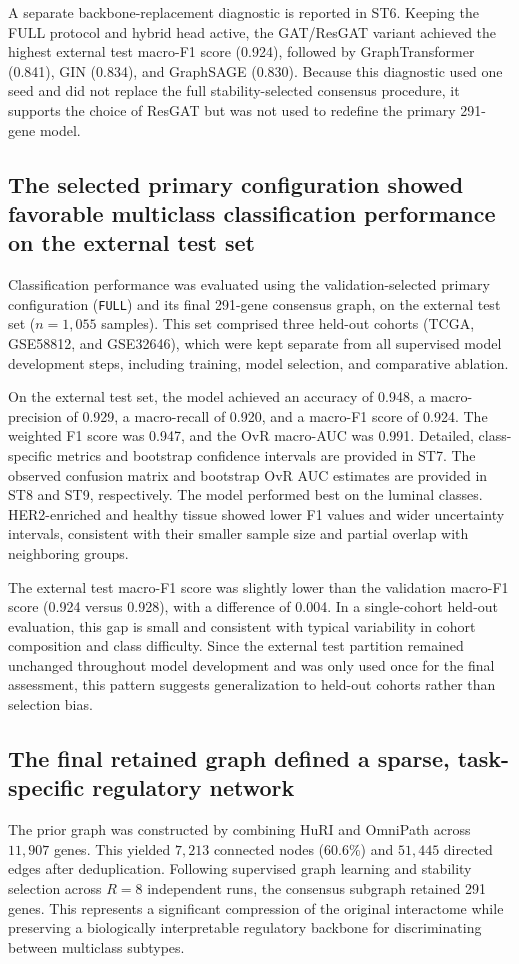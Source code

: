\documentclass[unnumsec,webpdf,modern,large]{oup-authoring-template}
\begin{document}
A separate backbone-replacement diagnostic is reported in ST6. Keeping the FULL protocol and hybrid head active, the GAT/ResGAT variant achieved the highest external test macro-F1 score (0.924), followed by GraphTransformer (0.841), GIN (0.834), and GraphSAGE (0.830). Because this diagnostic used one seed and did not replace the full stability-selected consensus procedure, it supports the choice of ResGAT but was not used to redefine the primary 291-gene model.

\subsection{The selected primary configuration showed favorable multiclass classification performance on the external test set}
Classification performance was evaluated using the validation-selected primary configuration (\texttt{FULL}) and its final 291-gene consensus graph, on the external test set (\(n=1{,}055\) samples). This set comprised three held-out cohorts (TCGA, GSE58812, and GSE32646), which were kept separate from all supervised model development steps, including training, model selection, and comparative ablation.

On the external test set, the model achieved an accuracy of 0.948, a macro-precision of 0.929, a macro-recall of 0.920, and a macro-F1 score of 0.924. The weighted F1 score was 0.947, and the OvR macro-AUC was 0.991. Detailed, class-specific metrics and bootstrap confidence intervals are provided in ST7. The observed confusion matrix and bootstrap OvR AUC estimates are provided in ST8 and ST9, respectively. The model performed best on the luminal classes. HER2-enriched and healthy tissue showed lower F1 values and wider uncertainty intervals, consistent with their smaller sample size and partial overlap with neighboring groups.

The external test macro-F1 score was slightly lower than the validation macro-F1 score (0.924 versus 0.928), with a difference of 0.004. In a single-cohort held-out evaluation, this gap is small and consistent with typical variability in cohort composition and class difficulty. Since the external test partition remained unchanged throughout model development and was only used once for the final assessment, this pattern suggests generalization to held-out cohorts rather than selection bias.

\subsection{The final retained graph defined a sparse, task-specific regulatory network}
The prior graph was constructed by combining HuRI and OmniPath across \(11{,}907\) genes. This yielded \(7{,}213\) connected nodes (\(60.6\%\)) and \(51{,}445\) directed edges after deduplication. Following supervised graph learning and stability selection across \(R=8\) independent runs, the consensus subgraph retained 291 genes. This represents a significant compression of the original interactome while preserving a biologically interpretable regulatory backbone for discriminating between multiclass subtypes.
\end{document}
